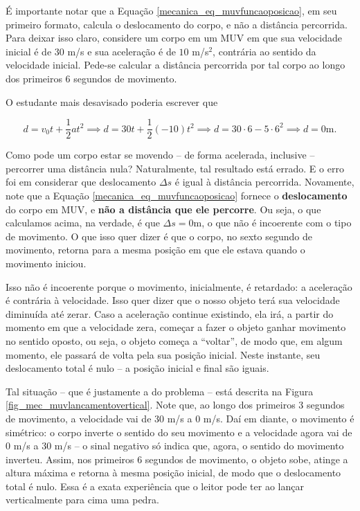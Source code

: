 

É importante notar que a Equação \eqref{mecanica_eq_muvfuncaoposicao}, em seu primeiro formato, calcula o deslocamento do corpo, e não a distância percorrida. Para deixar isso claro, considere um corpo em um MUV em que sua velocidade inicial é de $30$ m/s e sua aceleração é de $10$ m/s$^2$, contrária ao sentido da velocidade inicial. Pede-se calcular a distância percorrida por tal corpo ao longo dos primeiros 6 segundos de movimento.

O estudante mais desavisado poderia escrever que

$$ d=v_0t+\dfrac{1}{2}at^2 \implies d = 30t+\dfrac{1}{2}(-10)t^2 \implies d=30 \cdot 6 -5 \cdot 6^2 \implies \boxed{d=0\text{m}.}$$

Como pode um corpo estar se movendo -- de forma acelerada, inclusive --  percorrer uma distância nula? Naturalmente, tal resultado está errado. E o erro foi em considerar que deslocamento $\Delta s$ é igual à distância percorrida. Novamente, note que a Equação \eqref{mecanica_eq_muvfuncaoposicao} fornece o \textbf{deslocamento} do corpo em MUV, e \textbf{não a distância que ele percorre}. Ou seja, o que calculamos acima, na verdade, é que $\Delta s=0$m, o que não é incoerente com o tipo de movimento. O que isso quer dizer é que o corpo, no sexto segundo de movimento, retorna para a mesma posição em que ele estava quando o movimento iniciou.

Isso não é incoerente porque o movimento, inicialmente, é retardado: a aceleração é contrária à velocidade. Isso quer dizer que o nosso objeto terá sua velocidade diminuída até zerar. Caso a aceleração continue existindo, ela irá, a partir do momento em que a velocidade zera, começar a fazer o objeto ganhar movimento no sentido oposto, ou seja, o objeto começa a ``voltar'', de modo que, em algum momento, ele passará de volta pela sua posição inicial. Neste instante, seu deslocamento total é nulo -- a posição inicial e final são iguais.

Tal situação -- que é justamente a do problema -- está descrita na Figura \ref{fig_mec_muvlancamentovertical}. Note que, ao longo dos primeiros 3 segundos de movimento, a velocidade vai de $30$ m/s a $0$ m/s. Daí em diante, o movimento é simétrico: o corpo inverte o sentido do seu movimento e a velocidade agora vai de $0$ m/s a $30$ m/s -- o sinal negativo só indica que, agora, o sentido do movimento inverteu. Assim, nos primeiros 6 segundos de movimento, o objeto sobe, atinge a altura máxima e retorna à mesma posição inicial, de modo que o deslocamento total é nulo. Essa é a exata experiência que o leitor pode ter ao lançar verticalmente para cima uma pedra.

